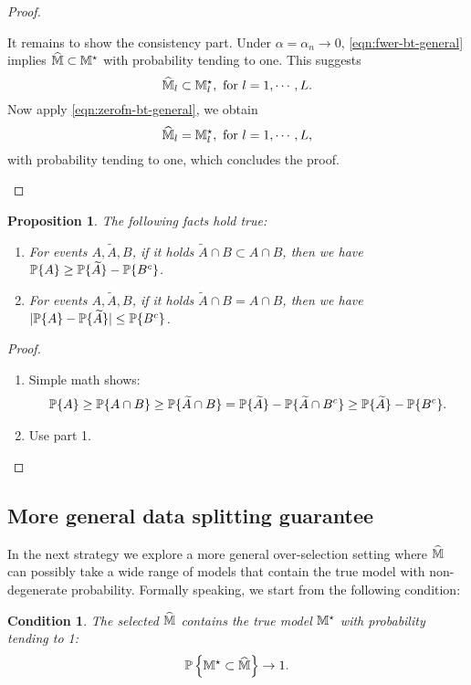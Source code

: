 \documentclass[12pt]{article}
\newtheorem{condition}{Condition}
\newtheorem{proposition}{Proposition}
\begin{document}
\begin{proof}
\begin{enumerate}
It remains to show the consistency part. Under $\alpha=\alpha_n\to0$, \eqref{eqn:fwer-bt-general} implies $\widehat{{\mathbb{M}}}\subset{\mathbb{M}}^\star$ with probability tending to one. This suggests
\[
\widehat{{\mathbb{M}}}_l\subset{\mathbb{M}}^\star_l,  \text{ for } l=1,\cdots, L.
\]
Now apply \eqref{eqn:zerofn-bt-general}, we obtain
\[
\widehat{{\mathbb{M}}}_l={\mathbb{M}}^\star_l,  \text{ for } l=1,\cdots, L,
\]
with probability tending to one, which concludes the proof.

\end{enumerate}
 
\end{proof}


\begin{proposition}
The following facts hold true:
\begin{enumerate}
    \item For events $A, \tilde{A}, B$, if it holds $\tilde{A} \cap B \subset  A \cap B$, then we have ${\mathbb{P}}\{A\} \ge {\mathbb{P}}\{\widetilde{A}\} - {\mathbb{P}}\{B^c\}$.
    \item For events $A, \tilde{A}, B$, if it holds $\tilde{A} \cap B =  A \cap B$, then we have $|{\mathbb{P}}\{A\} - {\mathbb{P}}\{\widetilde{A}\}| \le {\mathbb{P}}\{B^c\}$.
\end{enumerate}
\end{proposition}
\begin{proof}
\begin{enumerate}
    \item Simple math shows:
\begin{align*}
{\mathbb{P}}\{A\} \ge {\mathbb{P}}\{A\cap B\} \ge {\mathbb{P}}\{\widetilde{A}\cap B\} = {\mathbb{P}}\{\widetilde{A}\} - {\mathbb{P}}\{\widetilde{A}\cap B^c\} \ge {\mathbb{P}}\{\widetilde{A}\} - {\mathbb{P}}\{B^c\}.
\end{align*}

   \item Use part 1.

\end{enumerate}

\end{proof}




\subsection{More general data splitting guarantee}

In the next strategy we explore a more general over-selection setting where $\widehat{{\mathbb{M}}}$ can possibly take a wide range of models that contain the true model with non-degenerate probability. Formally speaking, we start from the following condition:
\begin{condition}\label{cond:over-selection}
The selected  $\widehat{{\mathbb{M}}}$ contains the true model ${\mathbb{M}}^\star$  with probability tending to 1:
\begin{align*}
    {{\mathbb{P}}\left\{{{\mathbb{M}}^\star} \subset \widehat{{\mathbb{M}}}\right\}}\to 1.
\end{align*}
\end{condition}
\end{document}
